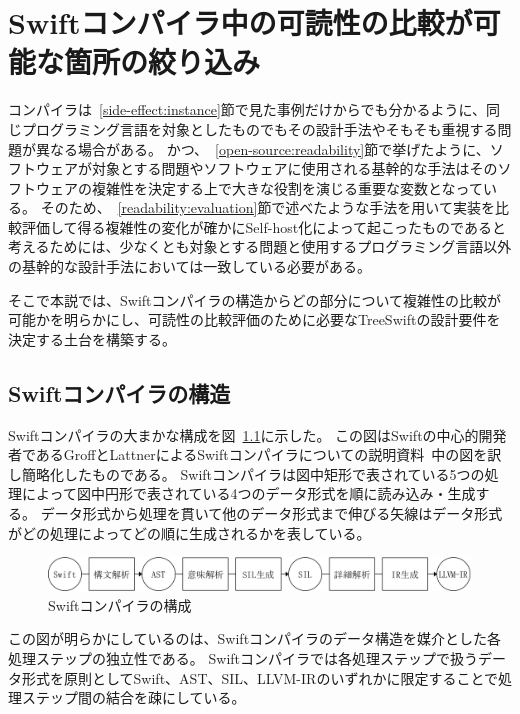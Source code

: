 \chapter{Swiftコンパイラ中の可読性の比較が可能な箇所の絞り込み}
\label{refinement}

コンパイラは~\ref{side-effect:instance}節で見た事例だけからでも分かるように、同じプログラミング言語を対象としたものでもその設計手法やそもそも重視する問題が異なる場合がある。
かつ、~\ref{open-source:readability}節で挙げたように、ソフトウェアが対象とする問題やソフトウェアに使用される基幹的な手法はそのソフトウェアの複雑性を決定する上で大きな役割を演じる重要な変数となっている。
そのため、~\ref{readability:evaluation}節で述べたような手法を用いて実装を比較評価して得る複雑性の変化が確かにSelf-host化によって起こったものであると考えるためには、少なくとも対象とする問題と使用するプログラミング言語以外の基幹的な設計手法においては一致している必要がある。

そこで本説では、Swiftコンパイラの構造からどの部分について複雑性の比較が可能かを明らかにし、可読性の比較評価のために必要なTreeSwiftの設計要件を決定する土台を構築する。

\section{Swiftコンパイラの構造}
\label{refinement:structure}

Swiftコンパイラの大まかな構成を図~\ref{img:swift-compiler-process}に示した。
この図はSwiftの中心的開発者であるGroffとLattnerによるSwiftコンパイラについての説明資料~\cite{sil}中の図を訳し簡略化したものである。
Swiftコンパイラは図中矩形で表されている5つの処理によって図中円形で表されている4つのデータ形式を順に読み込み・生成する。
データ形式から処理を貫いて他のデータ形式まで伸びる矢線はデータ形式がどの処理によってどの順に生成されるかを表している。

\begin{figure}
    \begin{center}
        \includegraphics[scale=0.5]{./img/swift_compiler_process.png}
        \caption{Swiftコンパイラの構成}
        \label{img:swift-compiler-process}
    \end{center}
\end{figure}

この図が明らかにしているのは、Swiftコンパイラのデータ構造を媒介とした各処理ステップの独立性である。
Swiftコンパイラでは各処理ステップで扱うデータ形式を原則としてSwift、AST、SIL、LLVM-IRのいずれかに限定することで処理ステップ間の結合を疎にしている。

